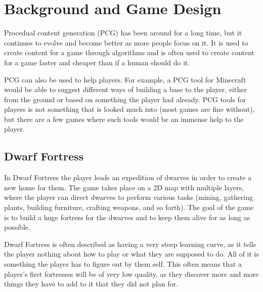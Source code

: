 \section{Background and Game Design}
\label{02}

Procedual content generation (PCG) has been around for a long time, but it continues to evolve and become better as more people focus on it. It is used to create content for a game through algorithms and is often used to create content for a game faster and cheaper than if a human should do it.

PCG can also be used to help players. For example, a PCG tool for Minecraft would be able to suggest different ways of building a base to the player, either from the ground or based on something the player had already. PCG tools for players is not something that is looked much into (most games are fine without), but there are a few games where such tools would be an immense help to the player.

\subsection{Dwarf Fortress}
\label{02_DF}

In Dwarf Fortress the player leads an expedition of dwarves in order to create a new home for them. The game takes place on a 2D map with multiple layers, where the player can direct dwarves to perform various tasks (mining, gathering plants, building furniture, crafting weapons, and so forth). The goal of the game is to build a huge fortress for the dwarves and to keep them alive for as long as possible.

Dwarf Fortress is often described as having a very steep learning curve, as it tells the player nothing about how to play or what they are supposed to do. All of it is something the player has to figure out by them self. This often means that a player's first fortresses will be of very low quality, as they discover more and more things they have to add to it that they did not plan for.



